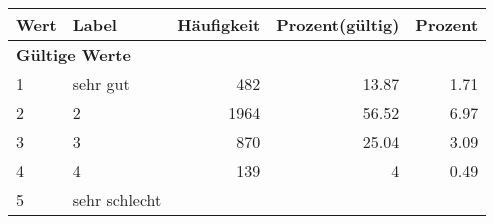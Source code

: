      \begin{longtable}{lXrrr}
     \toprule
     \textbf{Wert} & \textbf{Label} & \textbf{Häufigkeit} & \textbf{Prozent(gültig)} & \textbf{Prozent} \\
     \endhead
     \midrule
     \multicolumn{5}{l}{\textbf{Gültige Werte}}\\

     1 &
     \multicolumn{1}{X}{ sehr gut   } &


       \num{482} &
       \num[round-mode=places,round-precision=2]{13,87} &
         \num[round-mode=places,round-precision=2]{1,71} \\

     2 &
     \multicolumn{1}{X}{ 2   } &


       \num{1964} &
       \num[round-mode=places,round-precision=2]{56,52} &
         \num[round-mode=places,round-precision=2]{6,97} \\

     3 &
     \multicolumn{1}{X}{ 3   } &


       \num{870} &
       \num[round-mode=places,round-precision=2]{25,04} &
         \num[round-mode=places,round-precision=2]{3,09} \\

     4 &
     \multicolumn{1}{X}{ 4   } &


       \num{139} &
       \num[round-mode=places,round-precision=2]{4} &
         \num[round-mode=places,round-precision=2]{0,49} \\

     5 &
     \multicolumn{1}{X}{ sehr schlecht   } &



\end{longtable}
